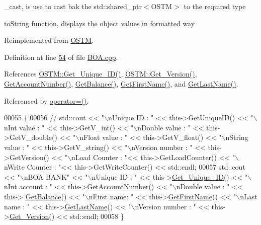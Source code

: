 \+\_\+cast, is use to cast bak the std\+::shared\+\_\+ptr$<$\+O\+S\+T\+M$>$ to the required type 

to\+String function, displays the object values in formatted way 

Reimplemented from \hyperlink{class_o_s_t_m_a513396a115f2987fd07c203309ae8a59_a513396a115f2987fd07c203309ae8a59}{O\+S\+TM}.



Definition at line \hyperlink{_b_o_a_8cpp_source_l00054}{54} of file \hyperlink{_b_o_a_8cpp_source}{B\+O\+A.\+cpp}.



References \hyperlink{_o_s_t_m_8cpp_source_l00073}{O\+S\+T\+M\+::\+Get\+\_\+\+Unique\+\_\+\+I\+D()}, \hyperlink{_o_s_t_m_8cpp_source_l00089}{O\+S\+T\+M\+::\+Get\+\_\+\+Version()}, \hyperlink{_b_o_a_8cpp_source_l00080}{Get\+Account\+Number()}, \hyperlink{_b_o_a_8cpp_source_l00072}{Get\+Balance()}, \hyperlink{_b_o_a_8cpp_source_l00096}{Get\+First\+Name()}, and \hyperlink{_b_o_a_8cpp_source_l00088}{Get\+Last\+Name()}.



Referenced by \hyperlink{_b_o_a_8h_source_l00064}{operator=()}.


\begin{DoxyCode}
00055 \{
00056    \textcolor{comment}{// std::cout << "\(\backslash\)nUnique ID : " << this->GetUniqueID() << "\(\backslash\)nInt value : " << this->GetV\_int() <<
       "\(\backslash\)nDouble value : " << this->GetV\_double() << "\(\backslash\)nFloat value : " << this->GetV\_float() << "\(\backslash\)nString value : " <<
       this->GetV\_string()  << "\(\backslash\)nVersion number : " << this->GetVersion() << "\(\backslash\)nLoad Counter : "<<
       this->GetLoadCounter() << "\(\backslash\)nWrite Counter : "<< this->GetWriteCounter() << std::endl;}
00057      std::cout << \textcolor{stringliteral}{"\(\backslash\)nBOA BANK"} << \textcolor{stringliteral}{"\(\backslash\)nUnique ID : "} << this->\hyperlink{class_o_s_t_m_a5a01a8b98d16b1d1904ecf9356e7b71d_a5a01a8b98d16b1d1904ecf9356e7b71d}{Get\_Unique\_ID}() << \textcolor{stringliteral}{"\(\backslash\)nInt account
       : "} << this->\hyperlink{class_b_o_a_ad64bd63675f8902153aa6767994f05dc_ad64bd63675f8902153aa6767994f05dc}{GetAccountNumber}() << \textcolor{stringliteral}{"\(\backslash\)nDouble value : "} << this->
      \hyperlink{class_b_o_a_a07e30b7e5f5f20392b94af7344fd550c_a07e30b7e5f5f20392b94af7344fd550c}{GetBalance}() << \textcolor{stringliteral}{"\(\backslash\)nFirst name: "} << this->\hyperlink{class_b_o_a_ae6bb3df4e1fb210610325ffd1985c7c0_ae6bb3df4e1fb210610325ffd1985c7c0}{GetFirstName}() << \textcolor{stringliteral}{"\(\backslash\)nLast name : "} << 
      this->\hyperlink{class_b_o_a_a081383edefc1f66b80c3fb8862ab070b_a081383edefc1f66b80c3fb8862ab070b}{GetLastName}()  << \textcolor{stringliteral}{"\(\backslash\)nVersion number : "} << this->\hyperlink{class_o_s_t_m_a1f1db9d482f22c8e7caa17dfb340626b_a1f1db9d482f22c8e7caa17dfb340626b}{Get\_Version}() << std::endl;
00058 \}
\end{DoxyCode}


